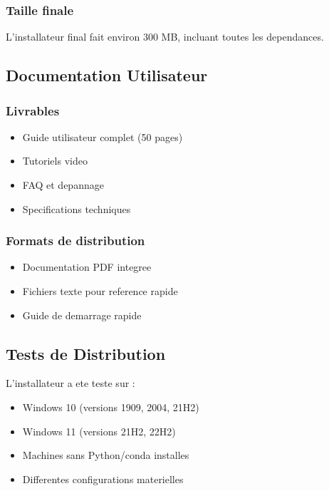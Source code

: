 \documentclass[12pt,a4paper]{article}
\begin{document}
\subsubsection{Taille finale}
L'installateur final fait environ 300 MB, incluant toutes les dependances.

\subsection{Documentation Utilisateur}

\subsubsection{Livrables}
\begin{itemize}
\item Guide utilisateur complet (50 pages)
\item Tutoriels video
\item FAQ et depannage
\item Specifications techniques
\end{itemize}

\subsubsection{Formats de distribution}
\begin{itemize}
\item Documentation PDF integree
\item Fichiers texte pour reference rapide
\item Guide de demarrage rapide
\end{itemize}

\subsection{Tests de Distribution}

L'installateur a ete teste sur :
\begin{itemize}
\item Windows 10 (versions 1909, 2004, 21H2)
\item Windows 11 (versions 21H2, 22H2)
\item Machines sans Python/conda installes
\item Differentes configurations materielles
\end{itemize}
\end{document}
